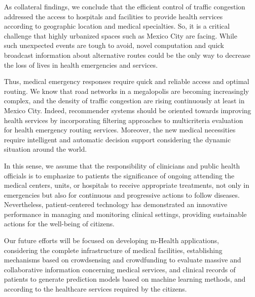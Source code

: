 \documentclass[sustainability,article,submit,pdftex,moreauthors]{Definitions/mdpi}
\begin{document}
As collateral findings, we conclude that the efficient control of traffic congestion addressed the access to hospitals and facilities to provide health services according to geographic location and medical specialties. So, it is a critical challenge that highly urbanized spaces such as Mexico City are facing. While such unexpected events are tough to avoid, novel computation and quick broadcast information about alternative routes could be the only way to decrease the loss of lives in health emergencies and services. 

Thus, medical emergency responses require quick and reliable access and optimal routing. We know that road networks in a megalopolis are becoming increasingly complex, and the density of traffic congestion are rising continuously at least in Mexico City. Indeed, recommender systems should be oriented towards improving health services by incorporating filtering approaches to multicriteria evaluation for health emergency routing services. Moreover, the new medical necessities require intelligent and automatic decision support considering the dynamic situation around the world.

In this sense, we assume that the responsibility of clinicians and public health officials is to emphasize to patients the significance of ongoing attending the medical centers, units, or hospitals to receive appropriate treatments, not only in emergencies but also for continuous and progressive actions to follow diseases. Nevertheless, patient-centered technology has demonstrated an innovative performance in managing and monitoring clinical settings, providing sustainable actions for the well-being of citizens.

Our future efforts will be focused on developing m-Health applications, considering the complete infrastructure of medical facilities, establishing mechanisms based on crowdsensing and crowdfunding to evaluate massive and collaborative information concerning medical services, and clinical records of patients to generate prediction models based on machine learning methods, and according to the healthcare services required by the citizens.



\end{document}
